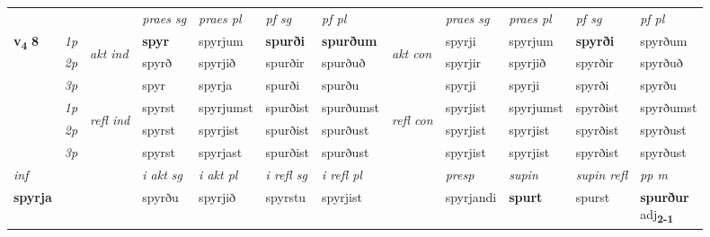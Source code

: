 \begin{longtable}[l]{X>{\footnotesize\itshape}llXXXXlXXXX}
 & &   & \textit{praes sg}  & \textit{praes pl}    & \textit{ pf sg} & \textit{pf pl} & & \textit{praes sg}  & \textit{praes pl}    & \textit{pf sg} & \textit{pf pl }  \\ \cmidrule{4-7} \cmidrule{9-12}
 \multirow{2}{*}{{{\textbf{v{\textsubscript{4}}} \Large{\textbf{8}}}}}  & 1p & \multirow{3}{*}{\begin{turn}{90}\textit{akt ind}\end{turn}} & \textbf{spyr} & spyrjum & \textbf{spurði} & \textbf{spurðum} & \multirow{3}{*}{\begin{turn}{90}\textit{akt con}\end{turn}} &spyrji & spyrjum & \textbf{spyrði} & spyrðum\\*
 & 2p &  &  spyrð  & spyrjið & spurðir & spurðuð & & spyrjir & spyrjið & spyrðir & spyrðuð \\*
 & 3p &  & spyr & spyrja & spurði & spurðu & & spyrji & spyrji& spyrði & spyrðu \\*
\cmidrule{4-7} \cmidrule{9-12}
 & 1p & \multirow{3}{*}{\begin{turn}{90}\textit{refl ind}\end{turn}}  & spyrst & spyrjumst & spurðist & spurðumst & \multirow{3}{*}{\begin{turn}{90}\textit{refl con}\end{turn}}  &spyrjist & spyrjumst & spyrðist & spyrðumst \\*
 & 2p &  & spyrst & spyrjist & spurðist & spurðust & &spyrjist & spyrjist & spyrðist & spyrðust \\*
 & 3p  & & spyrst & spyrjast & spurðist & spurðust & & spyrjist & spyrjist& spyrðist & spyrðust \\*
\cmidrule{4-7} \cmidrule{9-12}

   {\textit{inf}} & &  & \textit{i akt sg} & \textit{i akt pl} & \textit{i refl sg} & \textit{i refl pl} && \textit{presp} & \textit{supin} & \textit{supin refl} & \textit{pp m} \\*
  {\textbf{spyrja}} & && spyrðu  & spyrjið & spyrstu & spyrjist && spyrjandi &  \textbf{spurt} & spurst & \specialcell{\textbf{spurður} \\ adj\textbf{\textsubscript{2-1}}} \\*

\midrule


\end{longtable}
